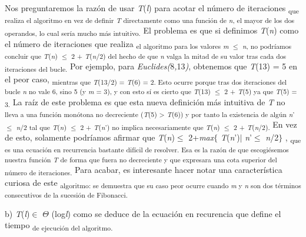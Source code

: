 \documentclass[12pt]{article}
\renewcommand{\_}{\kern-1.5pt\textunderscore\kern-1.5pt}
\begin{document}
\begin{adjustwidth}{0.57in}{0.57in}
\begin{justify}
{\fontsize{10pt}{12.0pt}\selectfont Nos preguntaremos la razón de usar \textit{T}(\textit{l}) para acotar el número de iteraciones \textsubscript{que realiza el algoritmo en vez de definir \textit{T }directamente como una función de \textit{n}, el mayor de los dos operandos, lo cual sería mucho más intuitivo. }El problema es que si definimos \textit{T}(\textit{n}) como el número de iteraciones que realiza \textsubscript{el algoritmo para los valores \textit{m }$ \leq $  \textit{n}, no podríamos concluir que \textit{T}(\textit{n}) $ \leq $  2 + \textit{T}(\textit{n}/2) del hecho de que \textit{n }valga la mitad de su valor tras cada dos iteraciones del bucle. }Por ejemplo, para \textit{Euclides(}8\textit{,}13\textit{)}, obtenemos que \textit{T}(13) = 5 en el peor caso, \textsubscript{mientras que \textit{T}(13/2) = \textit{T}(6) = 2. Esto ocurre porque tras dos iteraciones del bucle \textit{n }no vale 6, sino 5 (y \textit{m }= 3), y con esto sí es cierto que \textit{T}(13) $ \leq $  2 + \textit{T}(5) ya que \textit{T}(5) = 3. }La raíz de este problema es que esta nueva definición más intuitiva de \textit{T }no \textsubscript{lleva a una función monótona no decreciente (\textit{T}(5) > \textit{T}(6)) y por tanto la existencia de algún \textit{n}’ $ \leq $  \textit{n}/2 tal que \textit{T}(\textit{n}) $ \leq $  2 + \textit{T}(\textit{n}’) no implica necesariamente que \textit{T}(\textit{n}) $ \leq $  2 + \textit{T}(\textit{n}/2). }En vez de esto, solamente podríamos afirmar que \textit{T}(\textit{n})$ \leq $ 2+\textit{max}$ \{ $ \textit{T}(\textit{n}’)$ \vert $ \textit{n}’$ \leq $ \textit{n}/2$ \} $ , \textsubscript{que es una ecuación en recurrencia bastante difícil de resolver. Esa es la razón de que escogiésemos nuestra función \textit{T }de forma que fuera no decreciente y que expresara una cota superior del número de iteraciones. }Para acabar, es interesante hacer notar una característica curiosa de este \textsubscript{algoritmo: se demuestra que su caso peor ocurre cuando \textit{m }y \textit{n }son dos términos consecutivos de la sucesión de Fibonacci. }\par}
\end{justify}\par

\end{adjustwidth}

\begin{adjustwidth}{0.58in}{0.57in}
{\fontsize{10pt}{12.0pt}\selectfont b) \textit{T}(\textit{l})$ \in $ $ \Theta $ (log\textit{l}) como se deduce de la ecuación en recurencia que define el tiempo \textsubscript{de ejecución del algoritmo. }\par}\par

\end{adjustwidth}
\end{document}
